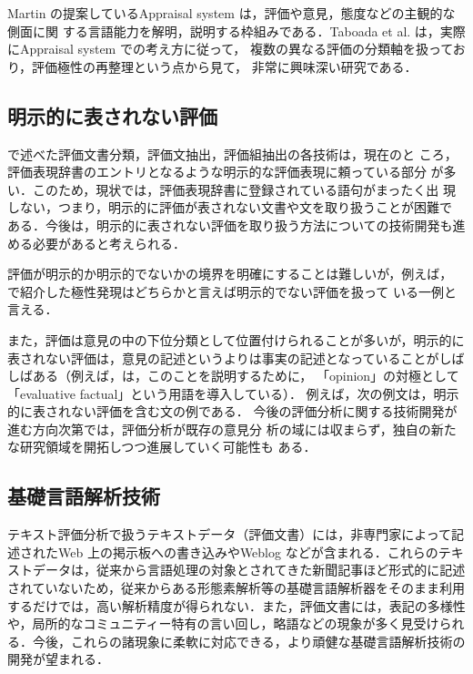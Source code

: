 

Martin の提案しているAppraisal system
\cite{martin2000a,martin2003a}は，評価や意見，態度などの主観的な側面に関
する言語能力を解明，説明する枠組みである．Taboada et
al. \cite{taboada2004a} は，実際にAppraisal system での考え方に従って，
複数の異なる評価の分類軸を扱っており，評価極性の再整理という点から見て，
非常に興味深い研究である．

\subsection{明示的に表されない評価}
\label{sec:imp}

で述べた評価文書分類，評価文抽出，評価組抽出の各技術は，現在のと
ころ，評価表現辞書のエントリとなるような明示的な評価表現に頼っている部分
が多い．このため，現状では，評価表現辞書に登録されている語句がまったく出
現しない，つまり，明示的に評価が表されない文書や文を取り扱うことが困難で
ある．今後は，明示的に表されない評価を取り扱う方法についての技術開発も進
める必要があると考えられる．

評価が明示的か明示的でないかの境界を明確にすることは難しいが，例えば，
 で紹介した極性発現はどちらかと言えば明示的でない評価を扱って
いる一例と言える．

また，評価は意見の中の下位分類として位置付けられることが多いが，明示的に
表されない評価は，意見の記述というよりは事実の記述となっていることがしば
しばある（例えば，\cite{nigam2004a}は，このことを説明するために，
「opinion」の対極として「evaluative factual」という用語を導入している）．
例えば，次の例文は，明示的に表されない評価を含む文の例である．
今後の評価分析に関する技術開発が進む方向次第では，評価分析が既存の意見分
析の域には収まらず，独自の新たな研究領域を開拓しつつ進展していく可能性も
ある．


\subsection{基礎言語解析技術}
\label{sec:parsing}

テキスト評価分析で扱うテキストデータ（評価文書）には，非専門家によって記
述されたWeb 上の掲示板への書き込みやWeblog などが含まれる．これらのテキ
ストデータは，従来から言語処理の対象とされてきた新聞記事ほど形式的に記述
されていないため，従来からある形態素解析等の基礎言語解析器をそのまま利用
するだけでは，高い解析精度が得られない．また，評価文書には，表記の多様性
や，局所的なコミュニティー特有の言い回し，略語などの現象が多く見受けられ
る．今後，これらの諸現象に柔軟に対応できる，より頑健な基礎言語解析技術の
開発が望まれる．

